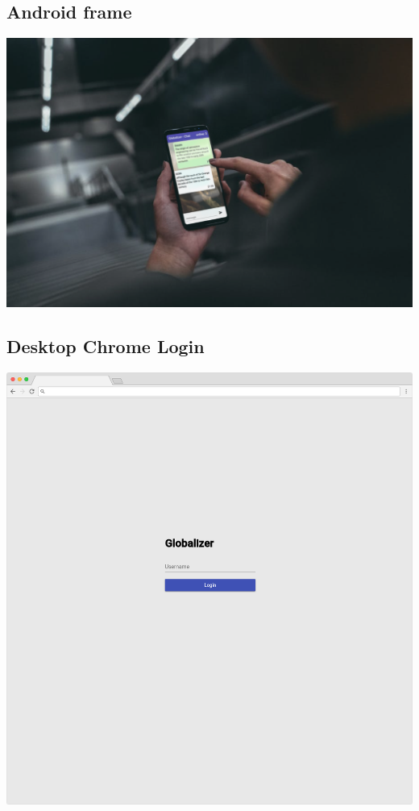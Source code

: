 \documentclass[12pt]{article}
\begin{document}
        \subsection{Android frame}
        \includegraphics[width=\textwidth]{mock-chat.png}
        \subsection{Desktop Chrome Login}
        \includegraphics[width=\textwidth]{frame-desktop-login.png}
\end{document}
